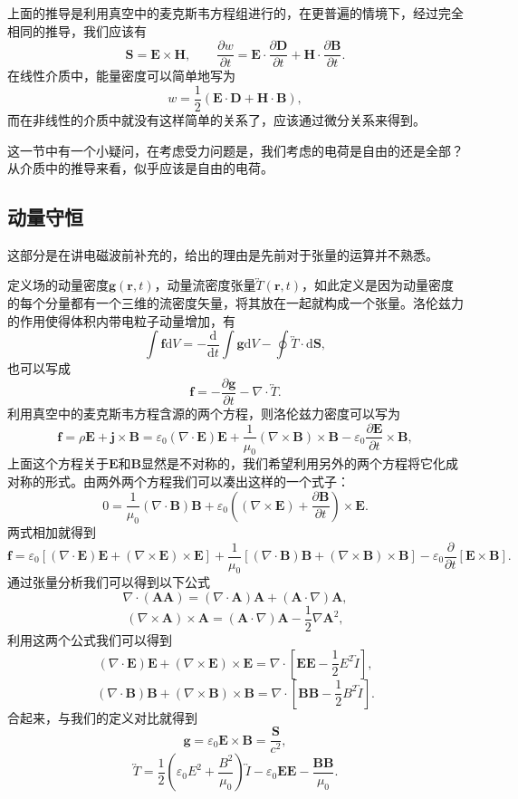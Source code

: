 \documentclass[UTF8]{ctexbook}
\renewcommand{\d}{\mathrm{d}}
\renewcommand{\b}{\boldsymbol}
\renewcommand{\t}{\overleftrightarrow}
\numberwithin{equation}{chapter}
\begin{document}
	上面的推导是利用真空中的麦克斯韦方程组进行的，在更普遍的情境下，经过完全相同的推导，我们应该有
	\[\b{S}=\b{E}\times\b{H},\qquad \frac{\partial w}{\partial t}=\b{E}\cdot\frac{\partial \b{D}}{\partial t}+\b{H}\cdot\frac{\partial \b{B}}{\partial t}.\]
	在线性介质中，能量密度可以简单地写为
	\[w=\frac{1}{2}(\b{E}\cdot\b{D}+\b{H}\cdot\b{B}),\]
	而在非线性的介质中就没有这样简单的关系了，应该通过微分关系来得到。
	
	这一节中有一个小疑问，在考虑受力问题是，我们考虑的电荷是自由的还是全部？从介质中的推导来看，似乎应该是自由的电荷。
	\subsection{动量守恒}
	这部分是在讲电磁波前补充的，给出的理由是先前对于张量的运算并不熟悉。
	
	定义场的动量密度$\b{g}(\b{r},t)$，动量流密度张量$\t{T}(\b{r},t)$，如此定义是因为动量密度的每个分量都有一个三维的流密度矢量，将其放在一起就构成一个张量。洛伦兹力的作用使得体积内带电粒子动量增加，有
	\[\int \b{f}\d V=-\frac{\d}{\d t}\int \b{g}\d V-\oint \t{T}\cdot\d\b{S},\]
	也可以写成
	\[\b{f}=-\frac{\partial \b{g}}{\partial t}-\nabla\cdot\t{T}.\]
	利用真空中的麦克斯韦方程含源的两个方程，则洛伦兹力密度可以写为
	\[\b{f}=\rho\b{E}+\b{j}\times\b{B}=\varepsilon_0(\nabla\cdot\b{E})\b{E}+\frac{1}{\mu_0}(\nabla\times\b{B})\times\b{B}-\varepsilon_0\frac{\partial \b{E}}{\partial t}\times\b{B},\]
	上面这个方程关于$\b{E}$和$\b{B}$显然是不对称的，我们希望利用另外的两个方程将它化成对称的形式。由两外两个方程我们可以凑出这样的一个式子：
	\[0=\frac{1}{\mu_0}(\nabla\cdot\b{B})\b{B}+\varepsilon_0\left((\nabla\times\b{E})+\frac{\partial \b{B}}{\partial t}\right)\times \b{E}.\]
	两式相加就得到
	\[\b{f}=\varepsilon_0\left[(\nabla\cdot\b{E})\b{E}+(\nabla\times\b{E})\times\b{E}\right]+\frac{1}{\mu_0}\left[(\nabla\cdot\b{B})\b{B}+(\nabla\times\b{B})\times\b{B}\right]-\varepsilon_0\frac{\partial}{\partial t}\left[\b{E}\times\b{B}\right].\]
	通过张量分析我们可以得到以下公式
	\[\nabla\cdot(\b{A}\b{A})=(\nabla\cdot\b{A})\b{A}+(\b{A}\cdot\nabla)\b{A},\]
	\[(\nabla\times\b{A})\times\b{A}=(\b{A}\cdot\nabla)\b{A}-\frac{1}{2}\nabla\b{A}^2,\]
	利用这两个公式我们可以得到
	\[(\nabla\cdot\b{E})\b{E}+(\nabla\times\b{E})\times\b{E}=\nabla\cdot[\b{E}\b{E}-\frac{1}{2}E^2\t{I}],\]
	\[(\nabla\cdot\b{B})\b{B}+(\nabla\times\b{B})\times\b{B}=\nabla\cdot[\b{B}\b{B}-\frac{1}{2}B^2\t{I}].\]
	合起来，与我们的定义对比就得到
	\[\b{g}=\varepsilon_0\b{E}\times\b{B}=\frac{\b{S}}{c^2},\]
	\[\t{T}=\frac{1}{2}\left(\varepsilon_0E^2+\frac{B^2}{\mu_0}\right)\t{I}-\varepsilon_0\b{E}\b{E}-\frac{\b{B}\b{B}}{\mu_0}.\]
	
\end{document}
